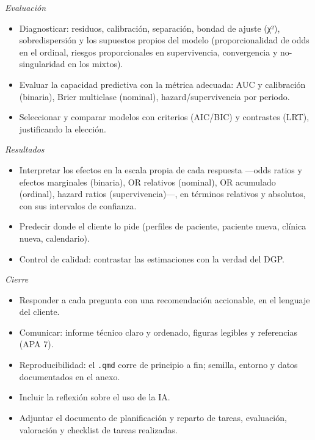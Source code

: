 \documentclass[
  letterpaper,
  DIV=11,
  numbers=noendperiod]{scrartcl}
\providecommand{\tightlist}{%
  \setlength{\itemsep}{0pt}\setlength{\parskip}{0pt}}\usepackage{longtable,booktabs,array}
\begin{document}
\emph{Evaluación}

\begin{itemize}
\tightlist
\item[$\square$]
  Diagnosticar: residuos, calibración, separación, bondad de ajuste
  (χ²), sobredispersión y los supuestos propios del modelo
  (proporcionalidad de odds en el ordinal, riesgos proporcionales en
  supervivencia, convergencia y no-singularidad en los mixtos).
\item[$\square$]
  Evaluar la capacidad predictiva con la métrica adecuada: AUC y
  calibración (binaria), Brier multiclase (nominal),
  hazard/supervivencia por periodo.
\item[$\square$]
  Seleccionar y comparar modelos con criterios (AIC/BIC) y contrastes
  (LRT), justificando la elección.
\end{itemize}

\emph{Resultados}

\begin{itemize}
\tightlist
\item[$\square$]
  Interpretar los efectos en la escala propia de cada respuesta ---odds
  ratios y efectos marginales (binaria), OR relativos (nominal), OR
  acumulado (ordinal), hazard ratios (supervivencia)---, en términos
  relativos y absolutos, con sus intervalos de confianza.
\item[$\square$]
  Predecir donde el cliente lo pide (perfiles de paciente, paciente
  nueva, clínica nueva, calendario).
\item[$\square$]
  Control de calidad: contrastar las estimaciones con la verdad del DGP.
\end{itemize}

\emph{Cierre}

\begin{itemize}
\tightlist
\item[$\square$]
  Responder a cada pregunta con una recomendación accionable, en el
  lenguaje del cliente.
\item[$\square$]
  Comunicar: informe técnico claro y ordenado, figuras legibles y
  referencias (APA 7).
\item[$\square$]
  Reproducibilidad: el \texttt{.qmd} corre de principio a fin; semilla,
  entorno y datos documentados en el anexo.
\item[$\square$]
  Incluir la reflexión sobre el uso de la IA.
\item[$\square$]
  Adjuntar el documento de planificación y reparto de tareas,
  evaluación, valoración y checklist de tareas realizadas.
\end{itemize}
\end{document}
